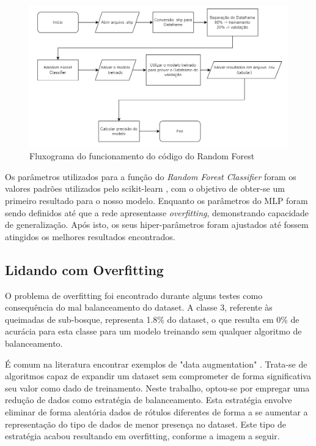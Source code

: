 \begin{figure}[H]
	\centering
	\begin{minipage}{0.98\linewidth}
		\centering
		\includegraphics[width=\linewidth]{tg1/figuras/rfflux.png}
		\caption{Fluxograma do funcionamento do código do Random Forest} \label{fig:rfflux}
	\end{minipage}
\end{figure}
Os parâmetros utilizados para a função do \textit{Random Forest Classifier} foram os valores padrões utilizados pelo scikit-learn \cite{sklearnrfc}, com o objetivo de obter-se um primeiro resultado para o nosso modelo. Enquanto os parâmetros do MLP foram sendo definidos até que a rede apresentasse \textit{overfitting}, demonstrando capacidade de generalização. Após isto, os seus hiper-parâmetros foram ajustados até fossem atingidos os melhores resultados encontrados.

\subsection{Lidando com Overfitting}
O problema de overfitting foi encontrado durante alguns testes como consequência do mal balanceamento do dataset. A classe 3, referente às queimadas de sub-bosque, representa 1.8\% do dataset, o que resulta em 0\% de acurácia para esta classe para um modelo treinando sem qualquer algoritmo de balanceamento.

É comum na literatura encontrar exemplos de "data augmentation" \cite{survey_data_augmentation}. Trata-se de algoritmos capaz de expandir um dataset sem comprometer de forma significativa seu valor como dado de treinamento. Neste trabalho, optou-se por empregar uma redução de dados como estratégia de balanceamento. Esta estratégia envolve eliminar de forma aleatória dados de rótulos diferentes de forma a se aumentar a representação do tipo de dados de menor presença no dataset. Este tipo de estratégia acabou resultando em overfitting, conforme a imagem a seguir.

